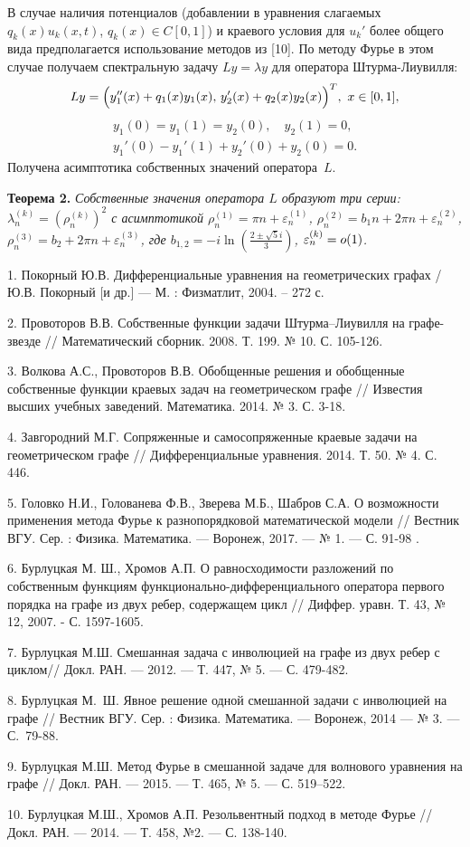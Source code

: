 В случае наличия потенциалов (добавлении в уравнения  слагаемых
$q_k(x)u_k(x,t)$, $q_k(x)\in C[0,1]$) и краевого условия для $u_k'$
более общего вида предполагается использование методов из [10]. По
методу Фурье в этом случае получаем спектральную задачу $Ly=\lambda
y$ для оператора Штурма-Лиувилля:
$$
    Ly=\Bigl(y_1''(x) + q_1(x) y_1(x), \,
    y_2'(x) +  q_2(x) y_2(x)\Bigl)^T,\   x\in [0,1], $$
    $$\begin{array}{c}
    y_1(0)=y_1(1)=y_2(0), \quad
    y_2(1)=0, \\
    y_1'(0) - y_1'(1) + y_2'(0) + y_2(0)=0.
    \end{array}
    $$
Получена асимптотика собственных значений   оператора~$L$.

    \textbf{Теорема 2.}
\textit{Собственные значения оператора $L$ образуют три серии:
$\lambda _n^{(k)}=(\rho_n^{(k)})^2$ с асимптотикой $\rho_n^{(1)}=\pi
n + \varepsilon_n^{(1)}$, $\rho_n^{(2)}=b_1 n + 2\pi n +
\varepsilon_n^{(2)}$, $\rho_n^{(3)}=b_2 + 2\pi n +
\varepsilon_n^{(3)}$,
    где $b _{1,2}=-i \ln(\frac{2\pm\sqrt{5}i}{3})$, $\varepsilon_n^{(k)}=\tiny{o}(1)$.} \\


    \nopagebreak

1.  Покорный Ю.В. Дифференциальные уравнения на геометрических
графах / Ю.В. Покорный [и др.] --- М. : Физматлит, 2004. -- 272 с.

2.  Провоторов В.В. Собственные функции задачи Штурма–Лиувилля на
графе-звезде // Математический сборник. 2008. Т. 199. № 10. С.
105-126.

3.  Волкова А.С., Провоторов В.В. Обобщенные решения и обобщенные
собственные функции краевых задач на геометрическом графе  //
Известия высших учебных заведений. Математика. 2014. № 3. С. 3-18.

4. Завгородний М.Г. Сопряженные и самосопряженные краевые задачи на
геометрическом графе   //
 Дифференциальные уравнения. 2014. Т. 50. № 4. С.
446.

5. Головко Н.И., Голованева Ф.В., Зверева М.Б., Шабров С.А. О
возможности применения метода Фурье к разнопорядковой математической
модели // Вестник ВГУ. Сер. :  Физика. Математика. --- Воронеж,
2017. --- № 1. --- С. 91-98 .

6.  Бурлуцкая М. Ш., Хромов  А.П.  О равносходимости разложений по
собственным функциям функционально-диф\-фе\-рен\-циаль\-ного
оператора первого порядка на  графе из двух ребер,  содержащем  цикл
// Диффер. уравн. Т. 43, №  12,  2007. - С. 1597-1605.

7. Бурлуцкая М.Ш. Смешанная задача с инволюцией на графе  из двух
ребер с циклом// Докл. РАН. --- 2012. --- Т. 447, № 5. --- С.
479-482.

8. Бурлуцкая М.~Ш.  Явное решение одной смешанной задачи с
 инволюцией на графе  // Вестник ВГУ.  Сер. : Физика. Математика. --- Воронеж, 2014 ---  № 3.
    --- С.~79-88.

9.  Бурлуцкая М.Ш. Метод Фурье в смешанной задаче для волнового
уравнения на графе   // Докл. РАН. --- 2015. --- Т. 465, № 5. --- С.
519–522.

10.  Бурлуцкая М.Ш., Хромов А.П. Резольвентный подход в методе Фурье
  // Докл. РАН. --– 2014. --- Т. 458, №2.
--- С. 138-140.
